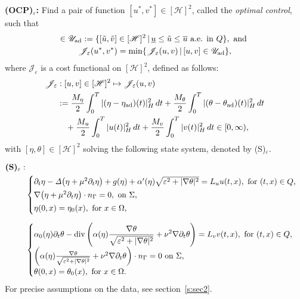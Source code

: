 \documentclass{sinst}
\numberwithin{equation}{section}
\theoremstyle{plain}
\theoremstyle{definition}
\def\sH{\mathscr{H}}
\def\sJ{\mathscr{J}}
\def\sU{\mathscr{U}}
\def\ad{{\rm ad}}
\def\ds{\displaystyle}
\begin{document}
\noindent
{\bf (OCP)$_\varepsilon$:} Find a pair of function $[u^*, v^*] \in [\sH]^2$, called the \textit{optimal control}, such that 
\begin{gather}
  [u^*, v^*] \in \sU_\ad := \{ [\tilde u, \tilde v] \in [\sH]^2 \,|\, \underline{u} \leq \tilde u \leq \overline{u} \mbox{ a.e.  in } Q \}, \mbox{ and } \label{ocp}
  \\
  \sJ_\varepsilon(u^*, v^*) = \min \{\sJ_\varepsilon(u,v) \,|\, [u,v] \in \sU_\ad\},
\end{gather}
where $\sJ_\varepsilon$ is a cost functional on $[\sH]^2$, defined as follows:
\begin{align}
  \sJ_\varepsilon&: [u,v] \in [\sH]^2 \mapsto \sJ_\varepsilon(u,v)
  \\
  &:= \frac{M_\eta}{2} \int_0^T |(\eta - \eta_{\rm ad})(t)|_H^2 \,dt + \frac{M_\theta}{2} \int_0^T |(\theta - \theta_\ad)(t)|_H^2 \,dt \label{cost}
  \\
  &\quad + \frac{M_u}{2} \int_0^T |u(t)|_H^2 \,dt + \frac{M_v}{2} \int_0^T |v(t)|_H^2 \,dt \in [0,\infty),
\end{align}
with $[\eta, \theta] \in [\sH]^2$ solving the following state system, denoted by (S)$_\varepsilon$.

\begin{align}
    \mbox{{\bf (S)}$_\varepsilon$}:&
    \\
    & \begin{cases}
        \partial_t \eta -\mathit{\Delta} \bigl( \eta +\mu^2 \partial_t \eta \bigr) +g(\eta) +\alpha'(\eta)\sqrt{\varepsilon^2 + |\nabla \theta|^2} = L_u u(t, x), ~ \mbox{for $ (t, x) \in Q $,}
        \\[0.5ex]
        \nabla \bigl( \eta +\mu^2 \partial_t \eta \bigr) \cdot n_\Gamma =  0, ~ \mbox{on $ \Sigma $,}
        \
        \\[0.5ex]
        \eta(0, x) = \eta_0(x),~ \mbox{for $ x \in \Omega $,}
    \end{cases}
    \label{(S)1st}
    \\[1.5ex]
    & \begin{cases}
        \ds \alpha_0(\eta) \partial_t \theta -\mathrm{div} \left( \alpha(\eta) \frac{\nabla \theta}{\sqrt{\varepsilon^2 + |\nabla \theta|^2}} +\nu^2 \nabla \partial_t \theta \right) = L_v v(t, x), ~ \mbox{for $ (t, x) \in Q $,}
        \\[1ex]
        \left( \alpha(\eta) \frac{\nabla \theta}{\sqrt{\varepsilon^2 + |\nabla \theta|^2}} +\nu^2 \nabla \partial_t \theta \right) \cdot n_\Gamma = 0 ~ \mbox{on $ \Sigma $,}
        \\[0.5ex]
        \theta(0, x) = \theta_0(x),~ \mbox{for $ x \in \Omega $.}
    \end{cases}
    \label{(S)2nd}
\end{align} 
For precise assumptions on the data, see section~\ref{s:sec2}.
\end{document}
